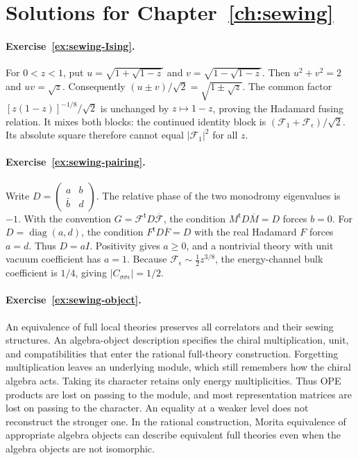 \section{Solutions for Chapter~\ref{ch:sewing}}

\paragraph{Exercise~\ref{ex:sewing-Ising}.}
\label{sol:ex:sewing-Ising}
For $0<z<1$, put $u=\sqrt{1+\sqrt{1-z}}$ and
$v=\sqrt{1-\sqrt{1-z}}$. Then
$u^2+v^2=2$ and $uv=\sqrt z$.
Consequently
$(u\pm v)/\sqrt2=\sqrt{1\pm\sqrt z}$.
The common factor $[z(1-z)]^{-1/8}/\sqrt2$
is unchanged by $z\mapsto1-z$, proving the Hadamard
fusing relation. It mixes both blocks: the continued
identity block is $(\mathcal F_1+\mathcal F_\epsilon)/\sqrt2$.
Its absolute square therefore cannot equal
$|\mathcal F_1|^2$ for all $z$.



\paragraph{Exercise~\ref{ex:sewing-pairing}.}
\label{sol:ex:sewing-pairing}
Write $D=\left(\begin{smallmatrix}a&b\\\bar b&d\end{smallmatrix}\right)$.
The relative phase of the two monodromy eigenvalues is $-1$.
With the convention $G=\mathcal F^{\mathsf t}D\overline{\mathcal F}$,
the condition $M^{\mathsf t}D\overline M=D$ forces $b=0$.
For $D=\operatorname{diag}(a,d)$, the condition
$F^{\mathsf t}D\overline F=D$ with the real Hadamard $F$ forces $a=d$.
Thus $D=aI$. Positivity gives $a\ge0$, and a nontrivial
theory with unit vacuum coefficient has $a=1$.
Because $\mathcal F_\epsilon\sim\frac12z^{3/8}$,
the energy-channel bulk coefficient is $1/4$, giving
$|C_{\sigma\sigma\epsilon}|=1/2$.



\paragraph{Exercise~\ref{ex:sewing-object}.}
\label{sol:ex:sewing-object}
An equivalence of full local theories preserves all
correlators and their sewing structures. An algebra-object
description specifies the chiral multiplication, unit, and
compatibilities that enter the rational full-theory construction.
Forgetting multiplication leaves an underlying module, which
still remembers how the chiral algebra acts. Taking its
character retains only energy multiplicities. Thus OPE
products are lost on passing to the module, and most
representation matrices are lost on passing to the character.
An equality at a weaker level does not reconstruct the stronger
one. In the rational construction, Morita equivalence of
appropriate algebra objects can describe equivalent full
theories even when the algebra objects are not isomorphic.



